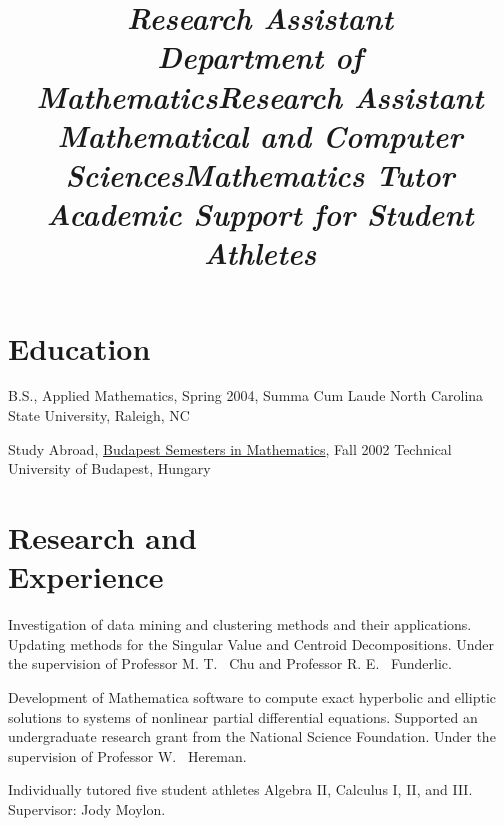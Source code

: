 \documentclass[margin,line,11pt,final]{res}
\begin{document}
\begin{resume}

\section{\sc Education}
B.S., Applied Mathematics, Spring 2004, Summa Cum Laude \newline
North Carolina State University, Raleigh, NC

Study Abroad, \href{http://www.stolaf.edu/depts/math/budapest/}
{Budapest Semesters in Mathematics}, Fall 2002 \newline
Technical University of Budapest, Hungary


\section{\sc Research and \\Experience}

\title{\em Research Assistant \\ Department of Mathematics}
\location{}
\begin{position}
Investigation of data mining and clustering methods and their
applications. Updating methods for the Singular Value and Centroid
Decompositions. Under the supervision of Professor M. T. \ Chu and
Professor R. E. \ Funderlic.
\end{position}

\title{\em Research Assistant \\ Mathematical and Computer Sciences}
\location{}
\begin{position}
Development of Mathematica software to compute exact hyperbolic and
elliptic solutions to systems of nonlinear partial differential
equations. Supported an undergraduate research grant from the National
Science Foundation.  Under the supervision of Professor W. \ Hereman.
\end{position}

\title{\em Mathematics Tutor \\ Academic Support for Student Athletes}
\location{}
\begin{position}
Individually tutored five student athletes Algebra II, Calculus I, II,
and III. Supervisor: Jody Moylon.
\end{position}


\end{resume}
\end{document}
